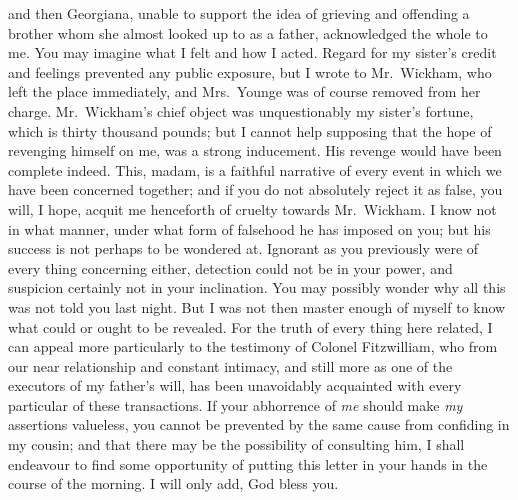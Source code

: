 \begin{letter}
and then Georgiana, unable to support the idea of grieving
and offending a brother whom she almost looked up to
as a father, acknowledged the whole to me. You may
imagine what I felt and how I acted. Regard for my
sister’s credit and feelings prevented any public exposure,
but I wrote to Mr.\ Wickham, who left the place immediately,
and Mrs.\ Younge was of course removed from her
charge. Mr.\ Wickham’s chief object was unquestionably
my sister’s fortune, which is thirty thousand pounds;
but I cannot help supposing that the hope of revenging
himself on me, was a strong inducement. His revenge
would have been complete indeed. This, madam, is a
faithful narrative of every event in which we have been
concerned together; and if you do not absolutely reject
it as false, you will, I hope, acquit me henceforth of cruelty
towards Mr.\ Wickham. I know not in what manner, under
what form of falsehood he has imposed on you; but his
success is not perhaps to be wondered at. Ignorant as you
previously were of every thing concerning either, detection
could not be in your power, and suspicion certainly
not in your inclination. You may possibly wonder why
all this was not told you last night. But I was not then
master enough of myself to know what could or ought
to be revealed. For the truth of every thing here related,
I can appeal more particularly to the testimony of Colonel
Fitzwilliam, who from our near relationship and constant
intimacy, and still more as one of the executors of my
father’s will, has been unavoidably acquainted with every
particular of these transactions. If your abhorrence of
\textit{me} should make \textit{my} assertions valueless, you cannot be
prevented by the same cause from confiding in my cousin;
and that there may be the possibility of consulting him,
I shall endeavour to find some opportunity of putting this
letter in your hands in the course of the morning. I will
only add, God bless you.

\end{letter}


